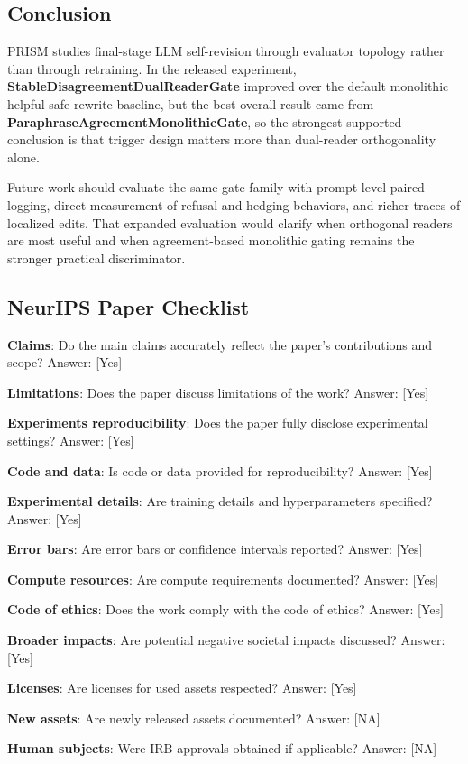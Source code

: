\documentclass{article}
\begin{document}
\subsection{Conclusion}

\label{sec:conclusion}

PRISM studies final-stage LLM self-revision through evaluator topology rather than through retraining. In the released experiment, \textbf{StableDisagreementDualReaderGate} improved over the default monolithic helpful-safe rewrite baseline, but the best overall result came from \textbf{ParaphraseAgreementMonolithicGate}, so the strongest supported conclusion is that trigger design matters more than dual-reader orthogonality alone.

Future work should evaluate the same gate family with prompt-level paired logging, direct measurement of refusal and hedging behaviors, and richer traces of localized edits. That expanded evaluation would clarify when orthogonal readers are most useful and when agreement-based monolithic gating remains the stronger practical discriminator.

\subsection{NeurIPS Paper Checklist}

\label{sec:neurips_paper_checklist}

\textbf{Claims}: Do the main claims accurately reflect the paper's contributions and scope?
Answer: [Yes]

\textbf{Limitations}: Does the paper discuss limitations of the work?
Answer: [Yes]

\textbf{Experiments reproducibility}: Does the paper fully disclose experimental settings?
Answer: [Yes]

\textbf{Code and data}: Is code or data provided for reproducibility?
Answer: [Yes]

\textbf{Experimental details}: Are training details and hyperparameters specified?
Answer: [Yes]

\textbf{Error bars}: Are error bars or confidence intervals reported?
Answer: [Yes]

\textbf{Compute resources}: Are compute requirements documented?
Answer: [Yes]

\textbf{Code of ethics}: Does the work comply with the code of ethics?
Answer: [Yes]

\textbf{Broader impacts}: Are potential negative societal impacts discussed?
Answer: [Yes]

\textbf{Licenses}: Are licenses for used assets respected?
Answer: [Yes]

\textbf{New assets}: Are newly released assets documented?
Answer: [NA]

\textbf{Human subjects}: Were IRB approvals obtained if applicable?
Answer: [NA]



\end{document}
